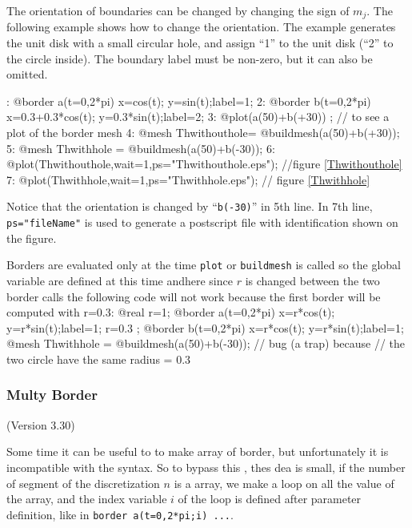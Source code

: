 \documentclass[a4paper,twoside,12pt]{book}
\def\setS#1{#1\label{sec:#1}}
\begin{document}
The orientation of boundaries can be changed by changing the sign of $m_j$.
The following example shows how to change the orientation.
The example generates the unit disk
with a small circular hole, and assign ``1'' to the unit disk
(``2'' to the circle inside).
The boundary label must be non-zero, but it can also be omitted.

: @border a(t=0,2*pi){ x=cos(t); y=sin(t);label=1;}
2: @border b(t=0,2*pi){ x=0.3+0.3*cos(t); y=0.3*sin(t);label=2;}
3: @plot(a(50)+b(+30)) ; // to see a plot of the border mesh 
4: @mesh Thwithouthole= @buildmesh(a(50)+b(+30));
5: @mesh Thwithhole   = @buildmesh(a(50)+b(-30));
6: @plot(Thwithouthole,wait=1,ps="Thwithouthole.eps"); //figure \ref{Thwithouthole}
7: @plot(Thwithhole,wait=1,ps="Thwithhole.eps"); // figure \ref{Thwithhole}
\eFF
\begin{note}
Notice that the orientation is changed by ``\texttt{b(-30)}'' in 5th line. In 7th line, \texttt{ps="fileName"} is used to generate a postscript file with identification shown on the figure.
\end{note}


\begin{note}
 Borders are evaluated only at the time \texttt{plot} or \texttt{buildmesh} is called  so
the global variable are defined  at this time andhere since $r$ is changed between the two border calls the following code will not work because the first border will be computed with r=0.3:
\bFF
   @real r=1;    @border a(t=0,2*pi){ x=r*cos(t); y=r*sin(t);label=1;}
   r=0.3    ;   @border b(t=0,2*pi){ x=r*cos(t); y=r*sin(t);label=1;}
   @mesh Thwithhole   = @buildmesh(a(50)+b(-30)); // bug (a trap) because
   // the two circle have the same radius = $0.3$
\eFF
\end{note}

\subsubsection{\setS{Multy Border}}
(Version 3.30)

Some time it can be useful to to make array of border, but unfortunately it is incompatible with the \freefempp syntax. 
So to bypass this , thes dea is small, if the number of segment of the discretization $n$ is a array, we make  a loop on all the value of the array, and
the index variable $i$ of the loop  is defined after  parameter definition,  like in \verb!border a(t=0,2*pi;i) ...!.
\end{document}
